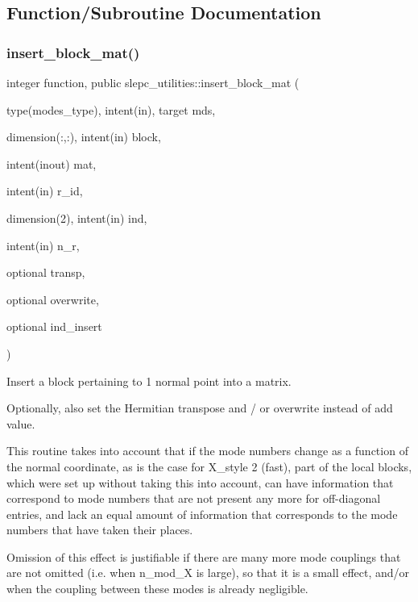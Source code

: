 \subsection{Function/\+Subroutine Documentation}
\mbox{\label{namespaceslepc__utilities_aa34aa361f0bfff9621ecba179f9ed0c6}} 
\subsubsection{\texorpdfstring{insert\+\_\+block\+\_\+mat()}{insert\_block\_mat()}}
{\footnotesize\ttfamily integer function, public slepc\+\_\+utilities\+::insert\+\_\+block\+\_\+mat (\begin{DoxyParamCaption}\item[{type(modes\+\_\+type), intent(in), target}]{mds,  }\item[{dimension(\+:,\+:), intent(in)}]{block,  }\item[{intent(inout)}]{mat,  }\item[{intent(in)}]{r\+\_\+id,  }\item[{dimension(2), intent(in)}]{ind,  }\item[{intent(in)}]{n\+\_\+r,  }\item[{optional}]{transp,  }\item[{optional}]{overwrite,  }\item[{optional}]{ind\+\_\+insert }\end{DoxyParamCaption})}



Insert a block pertaining to 1 normal point into a matrix. 

Optionally, also set the Hermitian transpose and / or overwrite instead of add value.

This routine takes into account that if the mode numbers change as a function of the normal coordinate, as is the case for X\+\_\+style 2 (fast), part of the local blocks, which were set up without taking this into account, can have information that correspond to mode numbers that are not present any more for off-\/diagonal entries, and lack an equal amount of information that corresponds to the mode numbers that have taken their places.

Omission of this effect is justifiable if there are many more mode couplings that are not omitted (i.\+e. when {\ttfamily n\+\_\+mod\+\_\+X} is large), so that it is a small effect, and/or when the coupling between these modes is already negligible.

